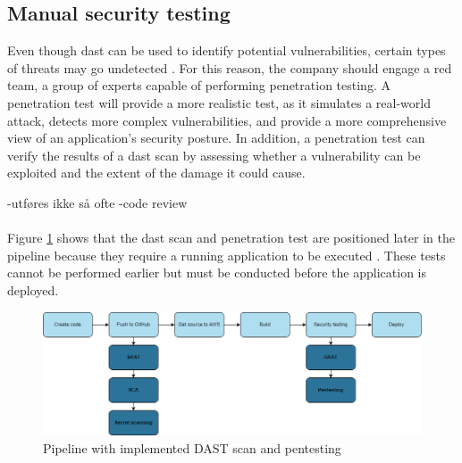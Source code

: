 \subsection{Manual security testing}

Even though \acrshort{dast} can be used to identify potential vulnerabilities, certain types of threats may go undetected \cite{dastpentesting}. For this reason, the company should engage a red team, a group of experts capable of performing penetration testing. A penetration test will provide a more realistic test, as it simulates a real-world attack, detects more complex vulnerabilities, and provide a more comprehensive view of an application's security posture. In addition, a penetration test can verify the results of a  \acrshort{dast} scan by assessing whether a vulnerability can be exploited and the extent of the damage it could cause. 

-utføres ikke så ofte
-code review
\\~\\
Figure \ref{fig: Pipeline with implemented DAST scan and pentesting} shows that the \acrshort{dast} scan and penetration test are positioned later in the pipeline because they require a running application to be executed \cite{dastplacment}. These tests cannot be performed earlier but must be conducted before the application is deployed.
\vspace{2mm}
\begin{figure}[H]
    \centering
    \includegraphics[width=0.8\columnwidth]{Images/pipeline5.png}
    \caption{Pipeline with implemented DAST scan and pentesting}
    \label{fig: Pipeline with implemented DAST scan and pentesting}
\end{figure}
